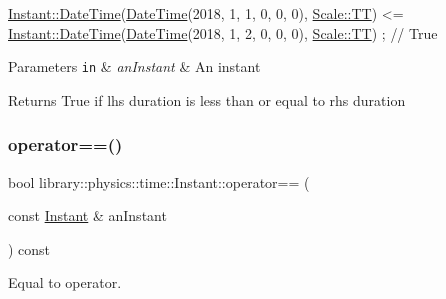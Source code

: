 \begin{DoxyCode}
\hyperlink{classlibrary_1_1physics_1_1time_1_1_instant_ac827b6ffa57ce75a3c56c462d4c872f8}{Instant::DateTime}(\hyperlink{classlibrary_1_1physics_1_1time_1_1_instant_ac827b6ffa57ce75a3c56c462d4c872f8}{DateTime}(2018, 1, 1, 0, 0, 0), 
      \hyperlink{namespacelibrary_1_1physics_1_1time_a09d2bc9fbc7b0b5f92e1419bd655e6bbadf1f3edb9115acb0a1e04209b7a9937b}{Scale::TT}) <= \hyperlink{classlibrary_1_1physics_1_1time_1_1_instant_ac827b6ffa57ce75a3c56c462d4c872f8}{Instant::DateTime}(\hyperlink{classlibrary_1_1physics_1_1time_1_1_instant_ac827b6ffa57ce75a3c56c462d4c872f8}{DateTime}(2018, 1, 2, 0, 0, 0), 
      \hyperlink{namespacelibrary_1_1physics_1_1time_a09d2bc9fbc7b0b5f92e1419bd655e6bbadf1f3edb9115acb0a1e04209b7a9937b}{Scale::TT}) ; \textcolor{comment}{// True}
\end{DoxyCode}



\begin{DoxyParams}[1]{Parameters}
\mbox{\tt in}  & {\em an\+Instant} & An instant \\
\hline
\end{DoxyParams}
\begin{DoxyReturn}{Returns}
True if lhs duration is less than or equal to rhs duration 
\end{DoxyReturn}
\mbox{\label{classlibrary_1_1physics_1_1time_1_1_instant_ab948da61d082b526741348e55547b1b7}} 
\subsubsection{\texorpdfstring{operator==()}{operator==()}}
{\footnotesize\ttfamily bool library\+::physics\+::time\+::\+Instant\+::operator== (\begin{DoxyParamCaption}\item[{const \hyperlink{classlibrary_1_1physics_1_1time_1_1_instant}{Instant} \&}]{an\+Instant }\end{DoxyParamCaption}) const}



Equal to operator. 


